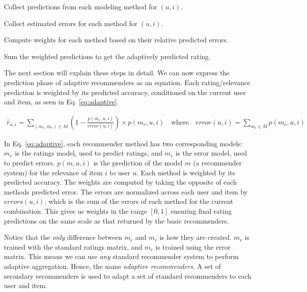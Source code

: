 \begin{enumerate*}
  \item Collect predictions from each modeling method for $(u,i)$.
  \item Collect estimated errors for each method for $(u,i)$.
  \item Compute weights for each method based on their relative predicted errors.
  \item Sum the weighted predictions to get the adaptively predicted rating.
\end{enumerate*}

The next section will explain these steps in detail.
We can now express the prediction phase of adaptive recommenders as an equation.
Each rating/relevance prediction is weighted by its predicted accuracy,
conditioned on the current user and item,
as seen in Eq. \ref{eq:adaptive}.

\begin{figure*}[!t]
\normalsize
\begin{eqnarray}
  \label{eq:adaptive}
  \hat{r}_{u,i} = \sum_{(m_{e}, m_{r}) \in M} (1 - 
  \frac{
    p(m_{e},u,i)
  }{
    error(u,i)
  }) \times p(m_{r},u,i)
  \quad
  \text{where}
  \quad
  error(u,i) = \sum_{m_e \in M} p(m_e,u,i) 
\end{eqnarray}
\hrulefill
\vspace*{4pt}
\end{figure*}

In Eq. \ref{eq:adaptive}, each recommender method has two corresponding models:
$m_r$ is the ratings model, used to predict ratings, and
$m_e$ is the error model, used to predict errors.
$p(m,u,i)$ is the prediction of the model $m$ (a recommender system)
for the relevance of item $i$ to user $u$.
Each method is weighted by its predicted accuracy.
The weights are computed by taking the opposite
of each methods predicted error.
The errors are normalized across each user and item by $errors(u,i)$,
which is the sum of the errors of each method for the current combination.
This gives us weights in the range $[0,1]$ ensuring
final rating predictions on the same scale as that returned by the basic recommenders.

Notice that the \emph{only} difference between $m_e$ and $m_r$ is how they are created.
$m_r$ is trained with the standard ratings matrix, and $m_e$ is trained using the error matrix.
This means we can use \emph{any} standard recommender system to perform adaptive aggregation.
Hence, the name \emph{adaptive recommenders}.
A set of secondary recommenders is used to adapt a set of standard
recommenders to each user and item.

